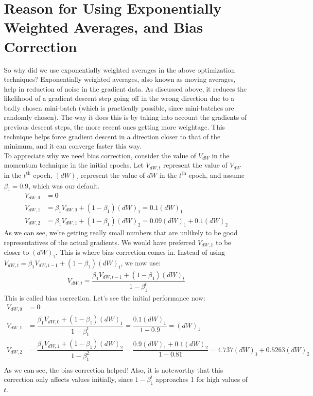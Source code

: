 \documentclass[a4paper, 12pt]{report}
\begin{document}
\section{Reason for Using Exponentially Weighted Averages, and Bias Correction}
So why did we use exponentially weighted averages in the above optimization techniques? Exponentially weighted averages, also known as moving averages, help in reduction of noise in the gradient data. As discussed above, it reduces the likelihood of a gradient descent step going off in the wrong direction due to a badly chosen mini-batch (which is practically possible, since mini-batches are randomly chosen). The way it does this is by taking into account the gradients of previous descent steps, the more recent ones getting more weightage. This technique helps force gradient descent in a direction closer to that of the minimum, and it can converge faster this way.\\
\break
To appreciate why we need bias correction, consider the value of $V_{dW}$ in the momentum technique in the initial epochs. Let $V_{dW,t}$ represent the value of $V_{dW}$ in the $t^{\text{th}}$ epoch, $(dW)_t$ represent the value of $dW$ in the $t^{\text{th}}$ epoch, and assume $\beta_1=0.9$, which was our default.
\begin{align*}
V_{dW,0} &= 0\\
V_{dW,1} &= \beta_1 V_{dW,0} + (1-\beta_1) (dW)_1 = 0.1 (dW)_1\\
V_{dW,2} &= \beta_1 V_{dW,1} + (1-\beta_1) (dW)_2 = 0.09 (dW)_1 + 0.1 (dW)_2
\end{align*}
As we can see, we're getting really small numbers that are unlikely to be good representatives of the actual gradients. We would have preferred $V_{dW,1}$ to be closer to $(dW)_1$. This is where bias correction comes in. Instead of using $V_{dW,t} = \beta_1 V_{dW,t-1} + (1-\beta_1) (dW)_t$, we now use:
\begin{align*}
V_{dW,t} = \dfrac{\beta_1 V_{dW,t-1} + (1-\beta_1) (dW)_t}{1-\beta_1^t}
\end{align*}
This is called bias correction. Let's see the initial performance now:
\begin{align*}
V_{dW,0} &= 0\\
V_{dW,1} &= \dfrac{\beta_1 V_{dW,0} + (1-\beta_1) (dW)_1}{1-\beta_1^1} = \dfrac{0.1 (dW)_1}{1-0.9} = (dW)_1\\
V_{dW,2} &= \dfrac{\beta_1 V_{dW,1} + (1-\beta_1) (dW)_2}{1-\beta_1^2} = \dfrac{0.9 (dW)_1 + 0.1 (dW)_2}{1-0.81} = 4.737 (dW)_1 + 0.5263 (dW)_2\\
\end{align*}
As we can see, the bias correction helped! Also, it is noteworthy that this correction only affects values initially, since $1-\beta_1^t$ approaches 1 for high values of $t$.
\end{document}
